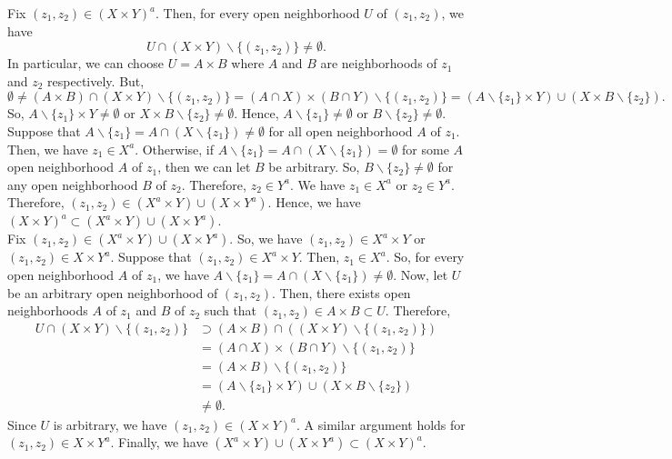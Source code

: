 \documentclass{article}
\begin{document}
\begin{enumerate}[label=\alph*)]
Fix $(z_1,z_2) \in (X \times Y)^a$. Then, for every open neighborhood $U$ of $(z_1,z_2)$, we have 
$$U \cap (X \times Y) \backslash \{(z_1,z_2)\} \neq \emptyset.$$ In particular, we can choose $U = 
A \times B$ where $A$ and $B$ are neighborhoods of $z_1$ and $z_2$ respectively. But, 
$$\emptyset \neq 
(A \times B) \cap (X \times Y) \backslash \{(z_1,z_2)\} = (A \cap X) \times (B \cap Y) \backslash 
\{(z_1,z_2)\} = (A \backslash \{z_1\} \times Y) \cup (X \times B \backslash \{z_2\}).$$ 
So, $A \backslash \{z_1\} \times Y \neq \emptyset$ or $X \times 
B \backslash \{z_2\} \neq \emptyset$. Hence, $A \backslash \{z_1\} \neq \emptyset$ or 
$B \backslash \{z_2\} \neq \emptyset$. Suppose that $A \backslash \{z_1\} = A \cap (X \backslash \{z_1\} )
\neq \emptyset$ for all open neighborhood $A$ of $z_1$. Then, we have 
$z_1\in X^a$. Otherwise, if $A \backslash \{z_1\} =A \cap( X \backslash \{z_1\} )= \emptyset$ for some 
$A$ open neighborhood $A$ of $z_1$, then we can let $B$ be arbitrary. So, 
$B \backslash \{z_2\} \neq \emptyset$ for any open neighborhood $B$ of $z_2$. Therefore, $z_2\in Y^a$. 
We have $z_1\in X^a$ or $z_2\in Y^a$. Therefore, $(z_1,z_2)\in (X^a \times Y) \cup (X \times Y^a)$.
Hence, we have $(X \times Y)^a \subset (X^a \times Y) \cup (X \times Y^a)$.\\

Fix $(z_1,z_2) \in (X^a \times Y) \cup (X \times Y^a)$. So, we have $(z_1,z_2) \in X^a \times Y$ or 
$(z_1,z_2) \in X \times Y^a$. Suppose that $(z_1,z_2) \in X^a \times Y$. Then, $z_1\in X^a$. So, for 
every open neighborhood $A$ of $z_1$, we have $A \backslash \{z_1\} = A \cap (X \backslash \{z_1\} )\neq 
\emptyset$. Now, let $U$ be an arbitrary open neighborhood of $(z_1,z_2)$. Then, there exists open 
neighborhoods $A$ of $z_1$ and $B$ of $z_2$ such that $(z_1,z_2) \in A \times B \subset U$. Therefore, 
\begin{align*}
    U \cap (X \times Y) \backslash \{(z_1,z_2)\} &\supset (A\times B) \cap \left((X \times Y) \backslash 
    \{(z_1,z_2)\}\right)\\ 
    &= (A \cap X) \times (B \cap Y) \backslash \{(z_1,z_2)\}\\ 
    &= (A \times B) \backslash \{(z_1,z_2)\}\\ 
    &= (A \backslash \{z_1\}\times Y) \cup (X \times B \backslash \{z_2\})\\ 
    &\neq \emptyset.
\end{align*} 
Since $U$ is arbitrary, we have $(z_1,z_2) \in (X \times Y)^a$. A similar argument holds for 
$(z_1,z_2) \in X \times Y^a$. Finally, we have $(X^a \times Y) \cup (X \times Y^a) 
\subset (X \times Y)^a$.

\end{enumerate}
\end{document}

